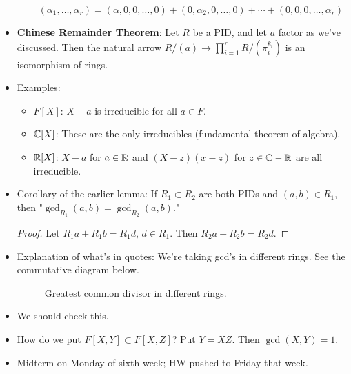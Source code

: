 \documentclass[../notes.tex]{subfiles}
\begin{document}
\begin{itemize}
\begin{itemize}
        \begin{equation*}
            (\alpha_1,\dots,\alpha_r) = (\alpha,0,0,\dots,0)+(0,\alpha_2,0,\dots,0)+\cdots+(0,0,0,\dots,\alpha_r)
        \end{equation*}
    \end{itemize}
    \item \textbf{Chinese Remainder Theorem}: Let $R$ be a PID, and let $a$ factor as we've discussed. Then the natural arrow $R/(a)\to\prod_{i=1}^rR/(\pi_i^{k_i})$ is an isomorphism of rings.
    \item Examples:
    \begin{itemize}
        \item $F[X]$: $X-a$ is irreducible for all $a\in F$.
        \item $\mathbb{C}[X]$: These are the only irreducibles (fundamental theorem of algebra).
        \item $\mathbb{R}[X]$: $X-a$ for $a\in\mathbb{R}$ and $(X-z)(x-z)$ for $z\in\mathbb{C}-\mathbb{R}$ are all irreducible.
    \end{itemize}
    \item Corollary of the earlier lemma: If $R_1\subset R_2$ are both PIDs and $(a,b)\in R_1$, then "$\gcd_{R_1}(a,b)=\gcd_{R_2}(a,b)$."
    \begin{proof}
        Let $R_1a+R_1b=R_1d$, $d\in R_1$. Then $R_2a+R_2b=R_2d$.
    \end{proof}
    \item Explanation of what's in quotes: We're taking gcd's in different rings. See the commutative diagram below.
    \begin{figure}[h!]
        \centering
        \caption{Greatest common divisor in different rings.}
        \label{fig:gcdContext}
    \end{figure}
    \item We should check this.
    \item How do we put $F[X,Y]\subset F[X,Z]$? Put $Y=XZ$. Then $\gcd(X,Y)=1$.
    \item Midterm on Monday of sixth week; HW pushed to Friday that week.
\end{itemize}
\end{document}
